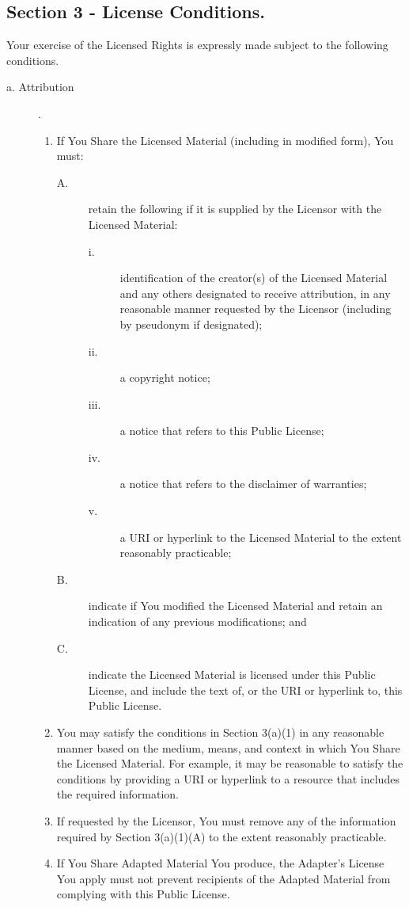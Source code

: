 \subsection{Section 3 - License Conditions.}
Your exercise of the Licensed Rights is expressly made subject to the following conditions.
\begin{description}
\item [a. Attribution].
\begin{enumerate}
\item If You Share the Licensed Material (including in modified form), You must:
\begin{description}
\item [A.] retain the following if it is supplied by the Licensor with the Licensed Material:
\begin{description}
\item [i.] identification of the creator(s) of the Licensed Material and any others designated to receive attribution, in any reasonable manner requested by the Licensor (including by pseudonym if designated);
\item [ii.] a copyright notice;
\item [iii.] a notice that refers to this Public License;
\item [iv.] a notice that refers to the disclaimer of warranties;
\item [v.] a URI or hyperlink to the Licensed Material to the extent reasonably practicable;
\end{description}
\item[B.]indicate if You modified the Licensed Material and retain an indication of any previous modifications; and
\item[C.]indicate the Licensed Material is licensed under this Public License, and include the text of, or the URI or hyperlink to, this Public License.
\end{description}
\item You may satisfy the conditions in Section 3(a)(1) in any reasonable manner based on the medium, means, and context in which You Share the Licensed Material. For example, it may be reasonable to satisfy the conditions by providing a URI or hyperlink to a resource that includes the required information.
\item If requested by the Licensor, You must remove any of the information required by Section 3(a)(1)(A) to the extent reasonably practicable.
\item If You Share Adapted Material You produce, the Adapter's License You apply must not prevent recipients of the Adapted Material from complying with this Public License.
\end{enumerate}
\end{description}
